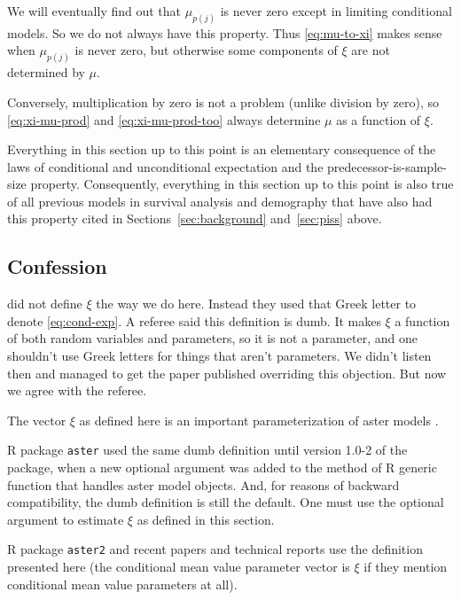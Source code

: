 We will eventually find out that $\mu_{p(j)}$ is never zero except in
limiting conditional models.  So we do not always have this property.
Thus \eqref{eq:mu-to-xi} makes sense when $\mu_{p(j)}$ is never zero,
but otherwise some components of $\xi$ are not determined by $\mu$.

Conversely, multiplication by zero is not a problem (unlike division by zero),
so \eqref{eq:xi-mu-prod} and \eqref{eq:xi-mu-prod-too} always determine
$\mu$ as a function of $\xi$.

Everything in this section up to this point is an elementary consequence
of the laws of conditional and unconditional expectation and the
predecessor-is-sample-size property.  Consequently,
everything in this section up to this point is also true of all previous
models in survival analysis and demography that have also had this property
cited in Sections~\ref{sec:background} and~\ref{sec:piss} above.

\subsection{Confession}

 did not define $\xi$
the way we do here.  Instead they used that Greek letter to denote
\eqref{eq:cond-exp}.
A referee said this definition is dumb.  It makes $\xi$ a function
of both random variables and parameters, so it is not a parameter,
and one shouldn't use Greek letters for things that aren't parameters.
We didn't listen then and managed to get the
paper published overriding this objection.  But now we agree with the referee.

The vector $\xi$ as defined here is an important parameterization of
aster models \citep[this has been realized since][]{aster-philosophical}.

R package \texttt{aster} used the same dumb definition until version
1.0-2 of the package, when a new optional argument 
was added to the method of R generic function  that handles
aster model objects.  And, for reasons of backward compatibility,
the dumb definition is still the default.
One must use the optional argument 
to estimate $\xi$ as defined in this section.

R package \texttt{aster2} and recent papers and technical reports use
the definition presented here (the conditional mean value parameter vector
is $\xi$ if they mention conditional mean value parameters at all).

